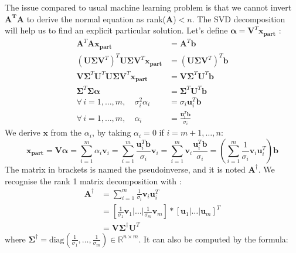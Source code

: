 \documentclass{article}
\begin{document}
The issue compared to usual machine learning problem is that we cannot invert $\mathbf{A^T} \mathbf{A}$ to derive the normal equation as rank($\mathbf{A}$)$<n$. The SVD decomposition will help us to find an explicit particular solution. Let's define $ \boldsymbol{\alpha} =  \mathbf{V}^T \mathbf{x_{part}} $ :
\begin{align*}
\mathbf{A}^T \mathbf{A} \mathbf{x_{part}} &=  \mathbf{A}^T \mathbf{b}  \\
(\mathbf{U}  \boldsymbol{\Sigma} \mathbf{V}^T)^T \mathbf{U}  \boldsymbol{\Sigma} \mathbf{V}^T \mathbf{x_{part}} &=  (\mathbf{U}  \boldsymbol{\Sigma} \mathbf{V}^T )^T  \mathbf{b}\\
\mathbf{V}  \boldsymbol{\Sigma}^T \mathbf{U}^T \mathbf{U}  \boldsymbol{\Sigma} \mathbf{V}^T \mathbf{x_{part}} &=  \mathbf{V}  \boldsymbol{\Sigma}^T \mathbf{U}^T \mathbf{b}\\
  \boldsymbol{\Sigma}^T \boldsymbol{\Sigma}  \boldsymbol{\alpha}&=    \boldsymbol{\Sigma}^T \mathbf{U}^T \mathbf{b}\\
  \forall \, i = 1, \dots, m, \quad \sigma_i^2 \alpha_i &= \sigma_i \mathbf{u}_i^T \mathbf{b}\\
    \forall \, i = 1, \dots, m, \quad  \alpha_i &= \frac{\mathbf{u}_i^T \mathbf{b}}{ \sigma_i}
\end{align*}
We derive $\mathbf{x}$ from the $\alpha_i$, by taking $\alpha_i=0$ if $i=m+1,\dots,n$:\\ 
\[
\mathbf{x_{part}}=\mathbf{V}\boldsymbol{\alpha}=\sum_{i=1}^m\alpha_i\mathbf{v}_i=\sum_{i=1}^m  \frac{\mathbf{u}_i^T \mathbf{b}}{ \sigma_i} \mathbf{v}_i=\sum_{i=1}^m \mathbf{v}_i \frac{\mathbf{u}_i^T \mathbf{b}}{ \sigma_i} = \left( \sum_{i=1}^m \frac{1}{\sigma_i} \mathbf{v}_i \mathbf{u}_i^T  \right) \mathbf{b}
\]
The matrix in brackets is named the pseudoinverse, and it is noted $\mathbf{A}^\dagger$. We recognise the rank 1 matrix decomposition with  :
\begin{align*}
\mathbf{A}^\dagger &=  \sum_{i=1}^m \frac{1}{\sigma_i} \mathbf{v}_i \mathbf{u}_i^T \\
&= [ \frac{1}{\sigma_1}\mathbf{v}_1 | \dots |\frac{1}{\sigma_m}  \mathbf{v}_m ]*[\mathbf{u}_1 | \dots | \mathbf{u}_m]^T\\
&= \mathbf{V}  \boldsymbol{\Sigma^\dagger} \mathbf{U}^T
\end{align*}
where $\boldsymbol{\Sigma}^\dagger = \text{diag}(\frac{1}{\sigma_1}, \dots, \frac{1}{\sigma_m}) \in \mathbb{R}^{n \times m}$. It can also be computed by the formula:\\
\end{document}

